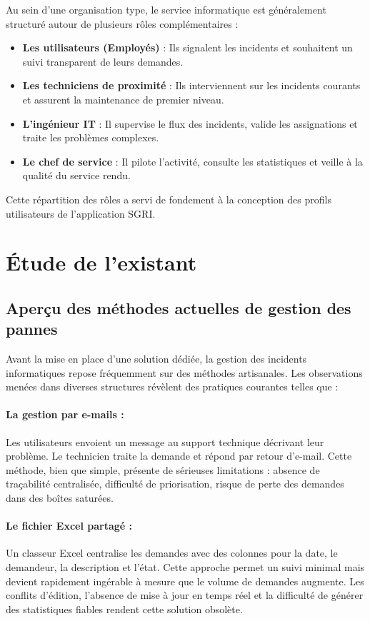 \documentclass[12pt,a4paper,twoside]{report}
\begin{document}
Au sein d'une organisation type, le service informatique est généralement structuré autour de plusieurs rôles complémentaires :

\begin{itemize}
    \item \textbf{Les utilisateurs (Employés)} : Ils signalent les incidents et souhaitent un suivi transparent de leurs demandes.
    \item \textbf{Les techniciens de proximité} : Ils interviennent sur les incidents courants et assurent la maintenance de premier niveau.
    \item \textbf{L'ingénieur IT} : Il supervise le flux des incidents, valide les assignations et traite les problèmes complexes.
    \item \textbf{Le chef de service} : Il pilote l'activité, consulte les statistiques et veille à la qualité du service rendu.
\end{itemize}

Cette répartition des rôles a servi de fondement à la conception des profils utilisateurs de l'application SGRI.

\section{Étude de l'existant}

\subsection{Aperçu des méthodes actuelles de gestion des pannes}

Avant la mise en place d'une solution dédiée, la gestion des incidents informatiques repose fréquemment sur des méthodes artisanales. Les observations menées dans diverses structures révèlent des pratiques courantes telles que :

\paragraph{La gestion par e-mails :}
Les utilisateurs envoient un message au support technique décrivant leur problème. Le technicien traite la demande et répond par retour d'e-mail. Cette méthode, bien que simple, présente de sérieuses limitations : absence de traçabilité centralisée, difficulté de priorisation, risque de perte des demandes dans des boîtes saturées.

\paragraph{Le fichier Excel partagé :}
Un classeur Excel centralise les demandes avec des colonnes pour la date, le demandeur, la description et l'état. Cette approche permet un suivi minimal mais devient rapidement ingérable à mesure que le volume de demandes augmente. Les conflits d'édition, l'absence de mise à jour en temps réel et la difficulté de générer des statistiques fiables rendent cette solution obsolète.
\end{document}
